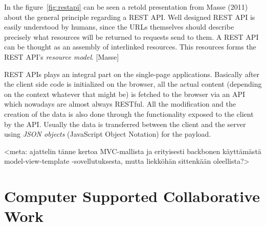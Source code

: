 In the figure~\ref{fig:restapi} can be seen a retold presentation from Masse (2011) about the general principle regarding a REST API. Well designed REST API is easily understood by humans, since the URLs themselves should describe precisely what resources will be returned to requests send to them. A REST API can be thought as an assembly of interlinked resources. This resources forms the REST API's \textit{resource model}. [Masse]

REST APIs plays an integral part on the single-page applications. Basically after the client side code is initialized on the browser, all the actual content (depending on the context whatever that might be) is fetched to the browser via an API which nowadays are almost always RESTful. All the modification and the creation of the data is also done through the functionality exposed to the client by the API. Usually the data is transferred between the client and the server using \textit{JSON objects} (JavaScript Object Notation) for the payload.


<meta: ajattelin tänne kertoa MVC-mallista ja erityisesti backbonen käyttämästä model-view-template -sovellutuksesta, mutta liekköhän sittenkään oleellista?>













\section{Computer Supported Collaborative Work}



